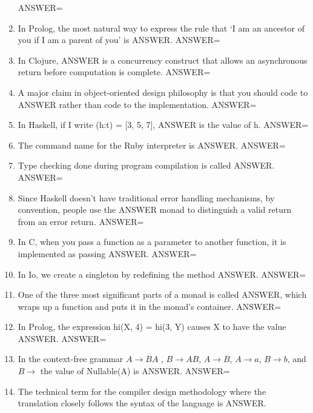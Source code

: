 \documentclass{exam}
\begin{document}
\begin{enumerate}
ANSWER=
\item In Prolog, the most natural way to express the rule that `I am an ancestor of you if I am a parent of you' is ANSWER.\newline
ANSWER=
\item In Clojure, ANSWER is a concurrency construct that allows an asynchronous return before computation is complete.\newline
ANSWER=
\item A major claim in object-oriented design philosophy is that you should code to ANSWER rather than code to the implementation.\newline
ANSWER=
\item In Haskell, if I write (h:t) = $\lbrack$3, 5, 7$\rbrack$, ANSWER is the value of h.\newline
ANSWER=
\item The command name for the Ruby interpreter is ANSWER.\newline
ANSWER=
\item Type checking done during program compilation is called ANSWER.\newline
ANSWER=
\item Since Haskell doesn't have traditional error handling mechanisms, by convention, people use the ANSWER monad to distinguish a valid return from an error return.\newline
ANSWER=
\item In C, when you pass a function as a parameter to another function, it is implemented as passing ANSWER.\newline
ANSWER=
\item In Io, we create a singleton by redefining the method ANSWER.\newline
ANSWER=
\item One of the three most significant parts of a monad is called ANSWER, which wraps up a function and puts it in the monad's container.\newline
ANSWER=
\item In Prolog, the expression hi(X, 4) = hi(3, Y) causes X to have the value ANSWER.\newline
ANSWER=
\item In the context-free grammar $A \rightarrow B A$ , $B \rightarrow A B$, $A \rightarrow B$, $A \rightarrow a$, $B \rightarrow b$, and $B \rightarrow$  the value of Nullable(A) is ANSWER.\newline
ANSWER=
\item The technical term for the compiler design methodology where the translation closely follows the syntax of the language is ANSWER.\newline

\end{enumerate}
\end{document}
